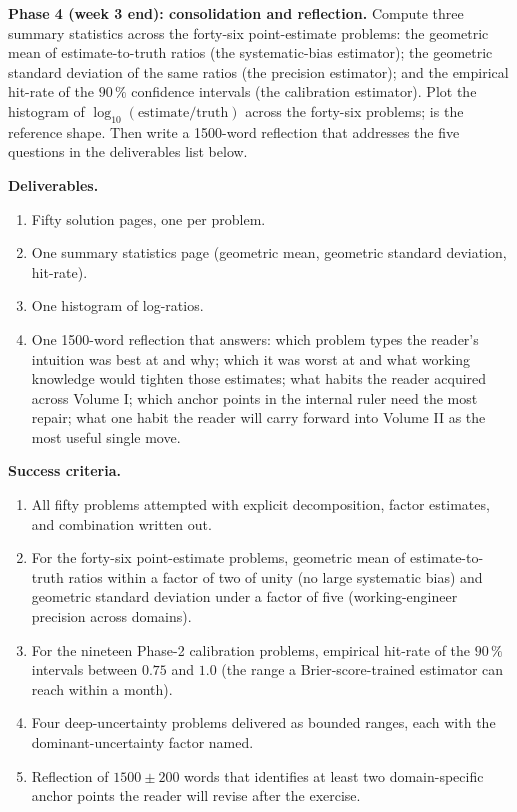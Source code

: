 \begin{project}
\textbf{Phase 4 (week 3 end): consolidation and reflection.}
Compute three summary statistics across the forty-six
point-estimate problems: the geometric mean of estimate-to-truth
ratios (the systematic-bias estimator); the geometric standard
deviation of the same ratios (the precision estimator); and the
empirical hit-rate of the $90\,\%$ confidence intervals (the
calibration estimator). Plot the histogram of $\log_{10}(\text{
estimate}/\text{truth})$ across the forty-six problems;
 is the reference shape. Then
write a 1500-word reflection that addresses the five questions in
the deliverables list below.

\textbf{Deliverables.}
\begin{enumerate}[leftmargin=*]
\item Fifty solution pages, one per problem.
\item One summary statistics page (geometric mean, geometric
standard deviation, hit-rate).
\item One histogram of log-ratios.
\item One 1500-word reflection that answers: which problem types
the reader's intuition was best at and why; which it was worst at
and what working knowledge would tighten those estimates; what
habits the reader acquired across Volume I; which anchor points in
the internal ruler need the most repair; what one habit the reader
will carry forward into Volume II as the most useful single move.
\end{enumerate}

\textbf{Success criteria.}
\begin{enumerate}[leftmargin=*]
\item All fifty problems attempted with explicit decomposition,
factor estimates, and combination written out.
\item For the forty-six point-estimate problems, geometric mean of
estimate-to-truth ratios within a factor of two of unity (no large
systematic bias) and geometric standard deviation under a factor
of five (working-engineer precision across domains).
\item For the nineteen Phase-2 calibration problems, empirical
hit-rate of the $90\,\%$ intervals between $0.75$ and $1.0$ (the
range a Brier-score-trained estimator can reach within a month).
\item Four deep-uncertainty problems delivered as bounded ranges,
each with the dominant-uncertainty factor named.
\item Reflection of $1500 \pm 200$ words that identifies at least
two domain-specific anchor points the reader will revise after
the exercise.
\end{enumerate}


\end{project}
